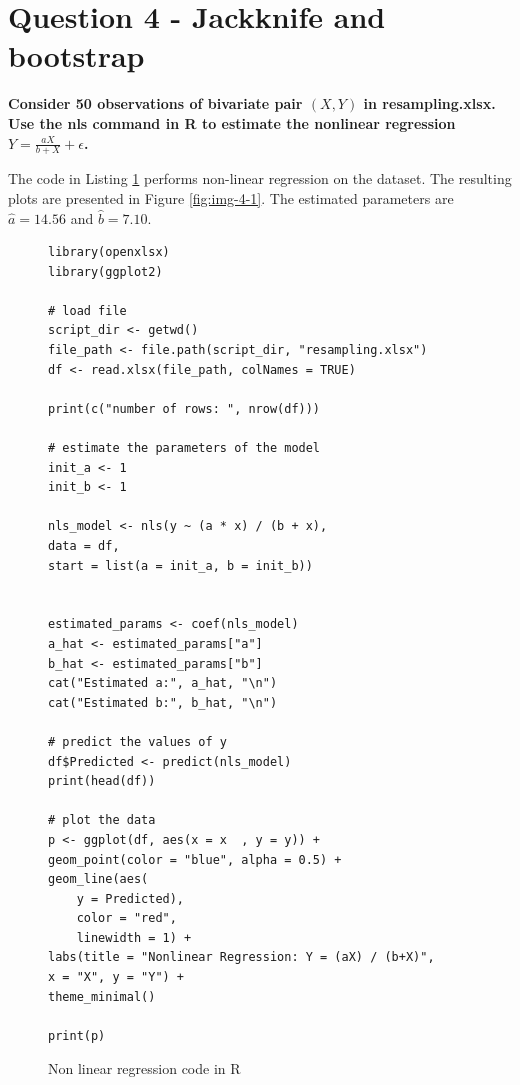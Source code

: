 \documentclass[]{article}
\begin{document}
\section{Question 4 - Jackknife and bootstrap}

\textbf{Consider 50 observations of bivariate pair $(X,Y)$ in resampling.xlsx. Use the nls command in R to estimate the nonlinear regression $Y=\frac{aX}{b+X} + \epsilon$.}

\bigskip

The code in Listing \ref{lst:nls} performs non-linear regression on the dataset. The resulting plots are presented in Figure \ref{fig:img-4-1}. The estimated parameters are $\hat{a} = 14.56$ and $\hat{b} = 7.10$.


\begin{figure}[H]
	\captionsetup{type=lstlisting}
	\begin{lstlisting}
library(openxlsx)
library(ggplot2)

# load file
script_dir <- getwd()
file_path <- file.path(script_dir, "resampling.xlsx")
df <- read.xlsx(file_path, colNames = TRUE)

print(c("number of rows: ", nrow(df)))

# estimate the parameters of the model
init_a <- 1
init_b <- 1

nls_model <- nls(y ~ (a * x) / (b + x),
data = df,
start = list(a = init_a, b = init_b))


estimated_params <- coef(nls_model)
a_hat <- estimated_params["a"]
b_hat <- estimated_params["b"]
cat("Estimated a:", a_hat, "\n")
cat("Estimated b:", b_hat, "\n")

# predict the values of y
df$Predicted <- predict(nls_model)
print(head(df))

# plot the data
p <- ggplot(df, aes(x = x  , y = y)) +
geom_point(color = "blue", alpha = 0.5) +
geom_line(aes(
	y = Predicted),
	color = "red",
	linewidth = 1) +
labs(title = "Nonlinear Regression: Y = (aX) / (b+X)",
x = "X", y = "Y") +
theme_minimal()

print(p)
	\end{lstlisting}
\caption{Non linear regression code in R}
\label{lst:nls}
\end{figure}
\end{document}
